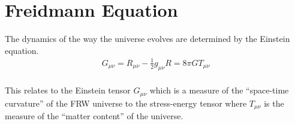 \section{Freidmann Equation}
\hspace{0.5cm}The dynamics of the way the universe evolves are determined by the Einstein equation.
\begin{align}
    G_{\mu \nu } = R_{\mu \nu } - \frac{1}{2} g_{\mu \nu } R = 8 \pi G T_{\mu \nu }\label{eq:1.10}
\end{align}\\
This relates to the Einstein tensor $G_{\mu \nu }$ which is a measure of the “space-time curvature” of the FRW
universe to the stress-energy tensor where $T_{\mu \nu }$ is the measure of the “matter content” of the universe.\\

